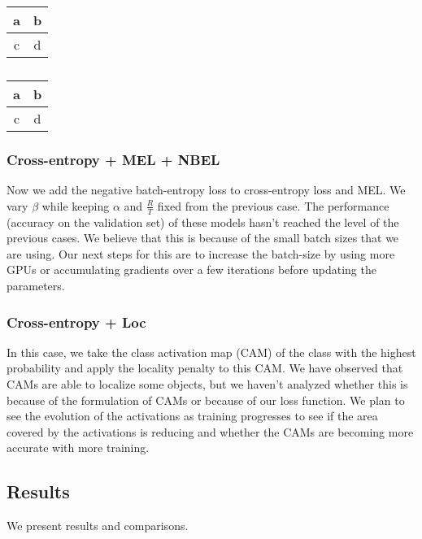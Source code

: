 \begin{table}
	\centering
	\begin{subtable}{0.15\textwidth}
	\centering
	\begin{tabular}{|c|c|}
		\hline
		a & b \\
		\hline
		c & d\\
		\hline
	\end{tabular}
	\caption{}
	\label{tab:cifar_mel_ratio}
	\end{subtable}
	\begin{subtable}{0.15\textwidth}
	\centering
	\begin{tabular}{|c|c|}
		\hline
		a & b \\
		\hline
		c & d\\
		\hline
	\end{tabular}
	\caption{}
	\label{tab:cifar_mel_unsup}
	\end{subtable}
\end{table}


\subsubsection{Cross-entropy + MEL + NBEL}
Now we add the negative batch-entropy loss to cross-entropy loss and MEL. We vary $\beta$ while
keeping $\alpha$ and $\frac{R}{T}$ fixed from the previous case. The performance (accuracy on the
validation set) of these models hasn't reached the level of the previous cases. We
believe that this is because of the small batch sizes that we are using. Our next steps for this are
to increase the batch-size by using more GPUs or accumulating gradients over a few iterations before
updating the parameters.

\subsubsection{Cross-entropy + Loc}
In this case, we take the class activation map (CAM) of the class with the highest probability and
apply the locality penalty to this CAM. We have observed that CAMs
are able to localize some objects, but we haven't analyzed whether this is because of the
formulation of CAMs or because of our loss function. We plan to see the evolution of the
activations as training progresses to see if the area covered by the activations is reducing and
whether the CAMs are becoming more accurate with more training. 

%

\subsection{Results}
We present results and comparisons.
